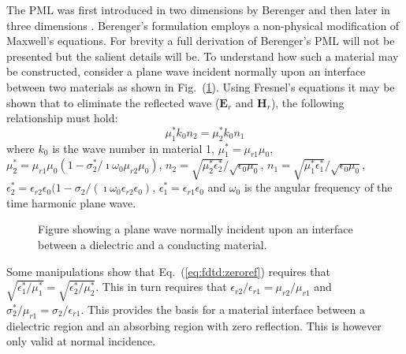 \documentclass[a4paper, 12pt]{article}
\newcommand{\eq}[1]{Eq.\ (\ref{#1})}
\newcommand{\rfig}[1]{Fig.\ (\ref{#1})}
\begin{document}
	The PML was first introduced in two dimensions by Berenger
	\cite{berenger94journcopmphys185} and then later in three dimensions
	\cite{berenger96journalcopmphys363}. Berenger's formulation employs a
	non-physical modification of Maxwell's equations. For brevity a full
	derivation of Berenger's PML will not be presented but the salient
	details will be. To understand how such a material may be constructed,
	consider a plane wave incident normally upon an interface between two
	materials as shown in \rfig{fig:fdtd:fresnel}. Using Fresnel's
	equations it may be shown that to eliminate the reflected wave
	($\mathbf{E}_r$ and $\mathbf{H}_r$), the following relationship must
	hold:
	\begin{equation}
		\label{eq:fdtd:zeroref}
		\mu^*_1k_0n_2=\mu_2^*k_0n_1
	\end{equation}
	where $k_0$ is the wave number in material 1, $\mu_1^*=\mu_{r1}\mu_0$,
	$\mu^*_2=\mu_{r1}\mu_0(1-\sigma_2^*/\imath\omega_0\mu_{r2}\mu_0)$,
	$n_2=\sqrt{\mu_2^*\epsilon_2^*}/\sqrt{\epsilon_0\mu_0}$,
	$n_1=\sqrt{\mu_1^*\epsilon_1^*}/\sqrt{\epsilon_0\mu_0}$,
	$\epsilon_2^*=\epsilon_{r2}\epsilon_0(1-\sigma_2/(\imath\omega_0\epsilon_{r2}\epsilon_0)$,
	$\epsilon^*_1=\epsilon_{r1}\epsilon_0$ and $\omega_0$ is the angular
	frequency of the time harmonic plane wave. 
	\begin{figure}[!h]
		\centering
		\caption{Figure showing a plane wave normally incident upon an
			interface between a dielectric and a conducting material.}
		\label{fig:fdtd:fresnel}
	\end{figure}
	Some manipulations show that \eq{eq:fdtd:zeroref} requires that
	$\sqrt{\epsilon_1^*/\mu_1^*}=\sqrt{\epsilon_2^*/\mu_2^*}$. This in
	turn requires that $\epsilon_{r2}/\epsilon_{r1}=\mu_{r2}/\mu_{r1}$ and
	$\sigma_2^*/\mu_{r1}=\sigma_2/\epsilon_{r1}$. This provides the basis
	for a material interface between a dielectric region and an absorbing
	region with zero reflection. This is however only valid at normal
	incidence. 
	
\end{document}
